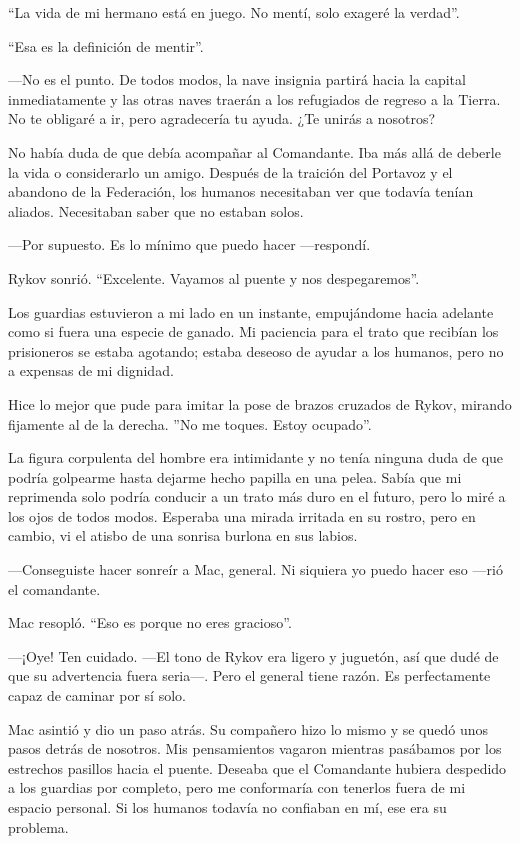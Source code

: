 ``La vida de mi hermano está en juego. No mentí, solo exageré la verdad''.

``Esa es la definición de mentir''.

—No es el punto. De todos modos, la nave insignia partirá hacia la capital inmediatamente y las otras naves traerán a los refugiados de regreso a la Tierra. No te obligaré a ir, pero agradecería tu ayuda. ¿Te unirás a nosotros?

No había duda de que debía acompañar al Comandante. Iba más allá de deberle la vida o considerarlo un amigo. Después de la traición del Portavoz y el abandono de la Federación, los humanos necesitaban ver que todavía tenían aliados. Necesitaban saber que no estaban solos.

—Por supuesto. Es lo mínimo que puedo hacer —respondí.

Rykov sonrió. ``Excelente. Vayamos al puente y nos despegaremos''.

Los guardias estuvieron a mi lado en un instante, empujándome hacia adelante como si fuera una especie de ganado. Mi paciencia para el trato que recibían los prisioneros se estaba agotando; estaba deseoso de ayudar a los humanos, pero no a expensas de mi dignidad.

Hice lo mejor que pude para imitar la pose de brazos cruzados de Rykov, mirando fijamente al de la derecha. ''No me toques. Estoy ocupado''.

La figura corpulenta del hombre era intimidante y no tenía ninguna duda de que podría golpearme hasta dejarme hecho papilla en una pelea. Sabía que mi reprimenda solo podría conducir a un trato más duro en el futuro, pero lo miré a los ojos de todos modos. Esperaba una mirada irritada en su rostro, pero en cambio, vi el atisbo de una sonrisa burlona en sus labios.

—Conseguiste hacer sonreír a Mac, general. Ni siquiera yo puedo hacer eso —rió el comandante.

Mac resopló. ``Eso es porque no eres gracioso''.

—¡Oye! Ten cuidado. —El tono de Rykov era ligero y juguetón, así que dudé de que su advertencia fuera seria—. Pero el general tiene razón. Es perfectamente capaz de caminar por sí solo.

Mac asintió y dio un paso atrás. Su compañero hizo lo mismo y se quedó unos pasos detrás de nosotros. Mis pensamientos vagaron mientras pasábamos por los estrechos pasillos hacia el puente. Deseaba que el Comandante hubiera despedido a los guardias por completo, pero me conformaría con tenerlos fuera de mi espacio personal. Si los humanos todavía no confiaban en mí, ese era su problema.

